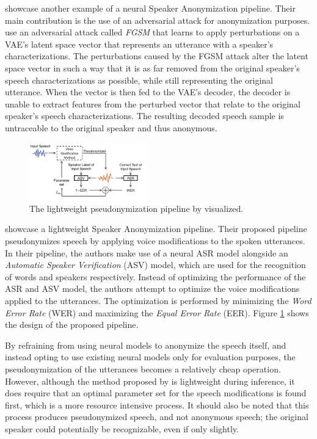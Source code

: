 \documentclass[11pt]{article}
\begin{document}
\citet{shihao2024adversarial} showcase another example of a neural Speaker Anonymization pipeline.
Their main contribution is the use of an adversarial attack for anonymization purposes.
\citeauthor{shihao2024adversarial} use an adversarial attack called \textit{FGSM} that learns to apply perturbations on a VAE's latent space vector that represents an utterance with a speaker's characterizations.
The perturbations caused by the FGSM attack alter the latent space vector in such a way that it is as far removed from the original speaker's speech characterizations as possible, while still representing the original utterance.
When the vector is then fed to the VAE's decoder, the decoder is unable to extract features from the perturbed vector that relate to the original speaker's speech characterizations.
The resulting decoded speech sample is untraceable to the original speaker and thus anonymous.

\begin{figure}[h]
  \centering
  \includegraphics[width=0.45\textwidth]{kai_etal_pipeline.png}
  \caption{The lightweight pseudonymization pipeline by \citet{kai2022lightweight} visualized.}
  \label{fig:kai_etal_pipeline}
\end{figure}

\citet{kai2022lightweight} showcase a lightweight Speaker Anonymization pipeline.
Their proposed pipeline pseudonymizes speech by applying voice modifications to the spoken utterances.
In their pipeline, the authors make use of a neural ASR model alongside an \textit{Automatic Speaker Verification} (ASV) model, which are used for the recognition of words and speakers respectively.
Instead of optimizing the performance of the ASR and ASV model, the authors attempt to optimize the voice modifications applied to the utterances.
The optimization is performed by minimizing the \textit{Word Error Rate} (WER) and maximizing the \textit{Equal Error Rate} (EER).
Figure \ref{fig:kai_etal_pipeline} shows the design of the proposed pipeline.

By refraining from using neural models to anonymize the speech itself, and instead opting to use existing neural models only for evaluation purposes, the pseudonymization of the utterances becomes a relatively cheap operation.
However, although the method proposed by \citeauthor{kai2022lightweight} is lightweight during inference, it does require that an optimal parameter set for the speech modifications is found first, which is a more resource intensive process.
It should also be noted that this process produces pseudonymized speech, and not anonymous speech; the original speaker could potentially be recognizable, even if only slightly.
\end{document}
